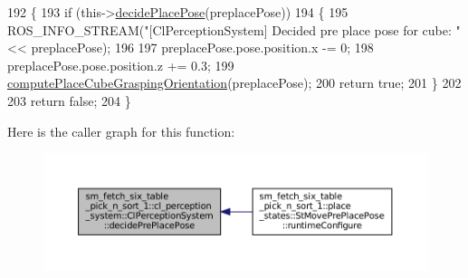 \begin{DoxyCode}
192             \{
193                 \textcolor{keywordflow}{if} (this->\hyperlink{classsm__fetch__six__table__pick__n__sort__1_1_1cl__perception__system_1_1ClPerceptionSystem_a553101516ba25a6a9f293e33b4e90dad}{decidePlacePose}(preplacePose))
194                 \{
195                     ROS\_INFO\_STREAM(\textcolor{stringliteral}{"[ClPerceptionSystem] Decided pre place pose for cube: "} << 
      preplacePose);
196 
197                     preplacePose.pose.position.x -= 0;
198                     preplacePose.pose.position.z += 0.3;
199                     \hyperlink{classsm__fetch__six__table__pick__n__sort__1_1_1cl__perception__system_1_1ClPerceptionSystem_a1689e36f9cb669ec8ec28d69f44f989d}{computePlaceCubeGraspingOrientation}(preplacePose);
200                     \textcolor{keywordflow}{return} \textcolor{keyword}{true};
201                 \}
202 
203                 \textcolor{keywordflow}{return} \textcolor{keyword}{false};
204             \}
\end{DoxyCode}
Here is the caller graph for this function\+:
\nopagebreak
\begin{figure}[H]
\begin{center}
\leavevmode
\includegraphics[width=350pt]{classsm__fetch__six__table__pick__n__sort__1_1_1cl__perception__system_1_1ClPerceptionSystem_ae69404508a52c60784861163701c5fee_icgraph}
\end{center}
\end{figure}
\mbox{\label{classsm__fetch__six__table__pick__n__sort__1_1_1cl__perception__system_1_1ClPerceptionSystem_a99ee4544e986811d5c7ff9dcce552eb0}} 
